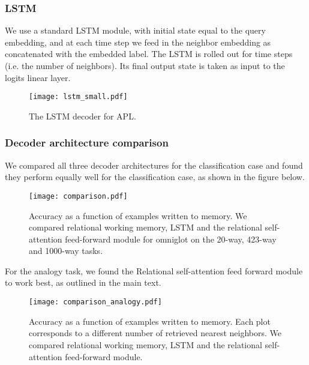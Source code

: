\documentclass{article} \usepackage{iclr2019_conference,times}
\begin{document}
\subsubsection{LSTM}

We use a standard LSTM module, with initial state equal to the query embedding, and at each time step we feed in the neighbor embedding as concatenated with the embedded label. The LSTM is rolled out for  time steps (i.e. the number of neighbors). Its final output state is taken as input to the logits linear layer.

\begin{figure}[ht]
    \centering
    \texttt{[image: lstm\_small.pdf]}
    \caption{The LSTM decoder for APL.}
    \label{fig:lstm}

\end{figure}

\subsubsection{Decoder architecture comparison}

We compared all three decoder architectures for the classification case and found they perform equally well for the classification case, as shown in the figure below.

\begin{figure}[ht!]
\begin{center}
\texttt{[image: comparison.pdf]}
\end{center}
\caption{Accuracy as a function of examples written to memory. We compared relational working memory, LSTM and the relational self-attention feed-forward module for omniglot on the 20-way, 423-way and 1000-way tasks.}
\end{figure}

For the analogy task, we found the Relational self-attention feed forward module to work best, as outlined in the main text.

\begin{figure}[ht!]
\begin{center}
\texttt{[image: comparison\_analogy.pdf]}
\end{center}
\caption{Accuracy as a function of examples written to memory. Each plot corresponds to a different number  of retrieved nearest neighbors. We compared relational working memory, LSTM and the relational self-attention feed-forward module.}
\end{figure}
\end{document}
